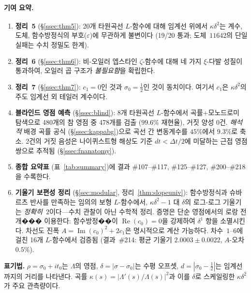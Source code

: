 \documentclass[11pt, a4paper]{article}
\theoremstyle{plain}
\theoremstyle{definition}
\begin{document}
\paragraph{기여 요약.}
\begin{enumerate}
  \item \textbf{정리~5} (\S\ref{ssec:thm5}): 20개 타원곡선
        $L$-함수에 대해 임계선 위에서 $\kappa\delta^{2}$는
        계수, 도체, 함수방정식의 부호($\varepsilon$)에 무관하게
        불변이다 (19/20 통과; 도체~$11642$의 단일 실패는
        수치 정밀도 한계).
  \item \textbf{정리~6} (\S\ref{ssec:thm6}): 비-오일러 엡스타인
        $\zeta$-함수에 대해 네 가지 $\xi$-다발 성질이 통과하여,
        오일러 곱 구조가 \emph{불필요함}을 확립한다.
  \item \textbf{정리~7} (\S\ref{ssec:thm7}): $c_{1}=0$인 것과
        $\sigma_{0}=\tfrac{1}{2}$인 것이 동치이다.
        여기서 $c_{1}$은 $\kappa\delta^{2}$의 주도 임계선 외
        테일러 계수이다.
  \item \textbf{블라인드 영점 예측} (\S\ref{ssec:blind}):
        8개 타원곡선 $L$-함수에서 곡률+모노드로미 탐색으로
        480개의 참 영점 중 478개를 검출 ($99.6\%$ 재현율),
        거짓 양성 0건.  \emph{해석적} 배경 곡률 공식
        (\S\ref{ssec:kappabg})으로 곡선 간 변동계수를
        $45\%$에서 $9.3\%$로 축소.  2건의 거짓 음성은
        나이퀴스트형 해상도 기준 $dt < \Delta t/2$에 미달하는
        근접 영점 쌍으로 추적됨 (\S\ref{ssec:fnanatomy}).
  \item \textbf{종합 요약표} (표~\ref{tab:summary})에
        결과 \#107--\#117, \#125--\#127, \#200--\#218을 수록한다.
  \item \textbf{기울기 보편성 정리} (\S\ref{sec:modular},
        정리~\ref{thm:slopeuniv}):
        함수방정식과 슈바르츠 반사를 만족하는 임의의 보형 $L$-함수에서,
        $\kappa\delta^{2}-1$ 대 $\delta$의 로그-로그 기울기는
        \emph{정확히}~$2$이다---수치 관찰이 아닌 수학적 정리.
        증명은 단순 영점에서의 로랑 전개��� 이용한다:
        함수방정��이 $\operatorname{Re}(c_0)=0$을 강제하여
        $\delta^1$ 항을 소멸시킨다.  차선도 진폭
        $A=\operatorname{Im}(c_0)^2+2c_1$은 명시적으로 계산 가능하다.
        차수~$1$--$6$에 걸친 16개 $L$-함수에서 검증됨
        (결과~\#214: 평균 기울기 $2.0003\pm 0.0022$, $A$-오차 $0.5\%$).
\end{enumerate}

\noindent\textbf{표기법.} $\rho = \sigma_{0}+it_{0}$는 $\Lambda$의 영점,
$\delta=|\sigma-\sigma_{0}|$는 수평 오프셋,
$d=|\sigma_{0}-\tfrac{1}{2}|$는 임계선까지의 거리를 나타낸다.
곡률 $\kappa(s) = |\Lambda'(s)/\Lambda(s)|^{2}$과
이를 $\delta$로 스케일링한 $\kappa\delta^{2}$가
주요 관측량이다.
\end{document}
